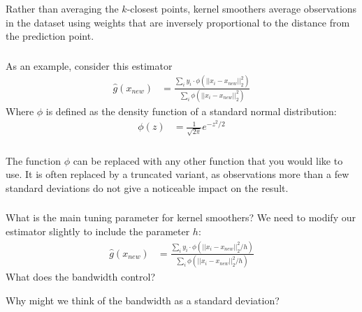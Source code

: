 \documentclass[xetex,mathserif,serif,aspectratio=169]{beamer}
\begin{document}
\begin{frame}[fragile] \frametitle{} \oldB \small


Rather than averaging the $k$-closest points, kernel smoothers average
observations in the dataset using weights that are inversely proportional
to the distance from the prediction point.

\end{frame}

\begin{frame}[fragile] \frametitle{} \oldB \small


As an example, consider this estimator
\begin{align*}
\widehat{g}(x_{new}) &= \frac{\sum_i y_i \cdot \phi(||x_i - x_{new}||_2^2) }{\sum_i \phi(||x_i - x_{new}||_2^2)}
\end{align*}
Where $\phi$ is defined as the density function of a standard normal distribution:
\begin{align*}
\phi(z) &= \frac{1}{\sqrt{2\pi}} e^{-z^2/2}
\end{align*}

\end{frame}


\begin{frame}[fragile] \frametitle{} \oldB \small


The function $\phi$ can be replaced with any other function that you
would like to use. It is often replaced by a truncated variant, as
observations more than a few standard deviations do not give a
noticeable impact on the result.

\end{frame}

\begin{frame}[fragile] \frametitle{} \oldB \small


What is the main tuning parameter for kernel smoothers? We need to modify
our estimator slightly to include the  parameter $h$:
\begin{align*}
\widehat{g}(x_{new}) &= \frac{\sum_i y_i \cdot \phi(||x_i - x_{new}||_2^2 / h) }{\sum_i \phi(||x_i - x_{new}||_2^2 / h)}
\end{align*}
What does the bandwidth control?

\pause Why might we think of the bandwidth as a standard deviation?

\end{frame}
\end{document}
